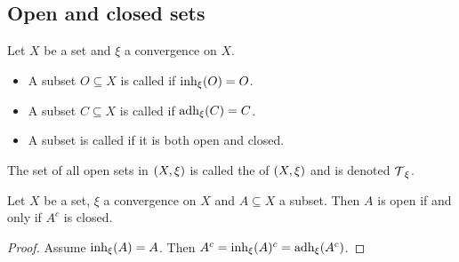 \subsection{Open and closed sets}
\begin{definition}
Let $X$ be a set and $\xi$ a convergence on $X$.
\begin{itemize}
    \item A subset $O \subseteq X$ is called  if $\operatorname{inh}_\xi(O) = O$.
    \item A subset $C \subseteq X$ is called  if $\operatorname{adh}_\xi(C) = C$.
    \item A subset is called  if it is both open and closed.
\end{itemize}
The set of all open sets in $\left( X,\xi \right)$ is called the  of $\left( X,\xi \right)$ and is denoted $\operatorname{\mathcal{T}}_\xi$.
\end{definition}

\begin{lemma} \label{openClosedComplement}
Let $X$ be a set, $\xi$ a convergence on $X$ and $A\subseteq X$ a subset. Then $A$ is open \textup{if and only if} $A^c$ is closed.
\end{lemma}
\begin{proof}
Assume $\operatorname{inh}_\xi(A) = A$. Then $A^c = \operatorname{inh}_\xi(A)^c = \operatorname{adh}_\xi(A^c)$.
\end{proof}

